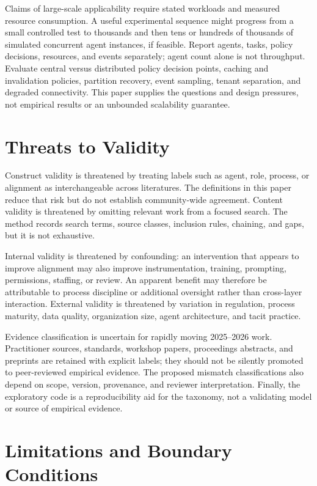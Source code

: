 \documentclass[11pt,letterpaper]{article}
\begin{document}
Claims of large-scale applicability require stated workloads and measured resource consumption. A useful experimental sequence might progress from a small controlled test to thousands and then tens or hundreds of thousands of simulated concurrent agent instances, if feasible. Report agents, tasks, policy decisions, resources, and events separately; agent count alone is not throughput. Evaluate central versus distributed policy decision points, caching and invalidation policies, partition recovery, event sampling, tenant separation, and degraded connectivity. This paper supplies the questions and design pressures, not empirical results or an unbounded scalability guarantee.

\section{Threats to Validity}
Construct validity is threatened by treating labels such as agent, role, process, or alignment as interchangeable across literatures. The definitions in this paper reduce that risk but do not establish community-wide agreement. Content validity is threatened by omitting relevant work from a focused search. The method records search terms, source classes, inclusion rules, chaining, and gaps, but it is not exhaustive.

Internal validity is threatened by confounding: an intervention that appears to improve alignment may also improve instrumentation, training, prompting, permissions, staffing, or review. An apparent benefit may therefore be attributable to process discipline or additional oversight rather than cross-layer interaction. External validity is threatened by variation in regulation, process maturity, data quality, organization size, agent architecture, and tacit practice.

Evidence classification is uncertain for rapidly moving 2025--2026 work. Practitioner sources, standards, workshop papers, proceedings abstracts, and preprints are retained with explicit labels; they should not be silently promoted to peer-reviewed empirical evidence. The proposed mismatch classifications also depend on scope, version, provenance, and reviewer interpretation. Finally, the exploratory code is a reproducibility aid for the taxonomy, not a validating model or source of empirical evidence.

\section{Limitations and Boundary Conditions}
\end{document}

